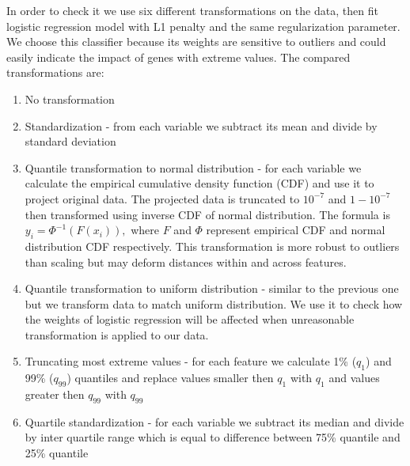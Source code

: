 \documentclass[shortabstract, english, mgr]{iithesis}
\begin{document}
In order to check it we use six different transformations on the data, then fit logistic regression model with L1 penalty and the same regularization parameter. We choose this classifier because its weights are sensitive to outliers and could easily indicate the impact of genes with extreme values. 
The compared transformations are:

\begin{enumerate}
    \item No transformation
    \item Standardization - from each variable we subtract its mean and divide by standard deviation
    \item Quantile transformation to normal distribution - for each variable we calculate the empirical cumulative density function (CDF) and use it to project original data. The projected data is truncated to $10^{-7}$ and $1-10^{-7}$ then transformed using inverse CDF of normal distribution. The formula is $y_{i}=\Phi^{-1}\left(F\left(x_{i}\right)\right),$ where $F$ and $\Phi$ represent empirical CDF and normal distribution CDF respectively. This transformation is more robust to outliers than scaling but may deform distances within and across features.
    \item Quantile transformation to uniform distribution - similar to the previous one but we transform data to match uniform distribution. We use it to check how the weights of logistic regression will be affected when unreasonable transformation is applied to our data.
    \item Truncating most extreme values - for each feature we calculate 1\% ($q_1$) and 99\% ($q_{99}$) quantiles and replace values smaller then $q_1$ with $q_1$ and values greater then $q_{99}$ with $q_{99}$
    \item Quartile standardization - for each variable we subtract its median and divide by inter quartile range which is equal to difference between 75\% quantile and 25\% quantile
\end{enumerate}
\end{document}
